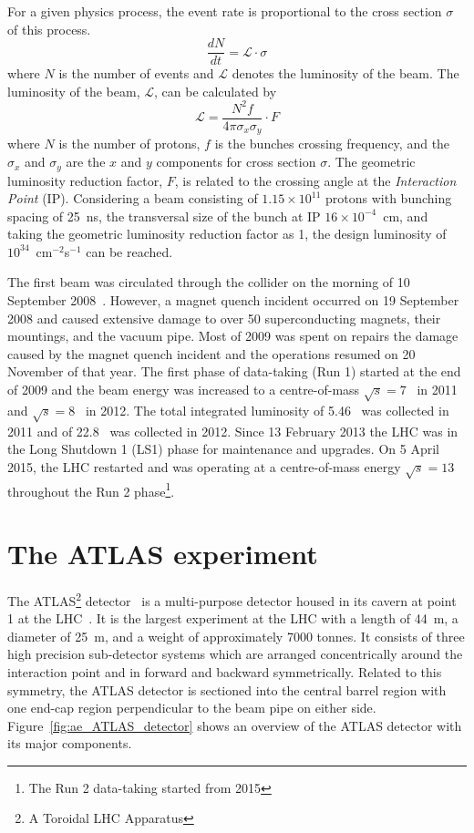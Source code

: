 For a given physics process, the event rate is proportional to the cross section $\sigma$ of this process.
%
\begin{equation}
\frac{dN}{dt} = \mathcal{L}\cdot\sigma
\end{equation}
%
where $N$ is the number of events and $\mathcal{L}$ denotes the luminosity of the beam.
The luminosity of the beam, $\mathcal{L}$, can be calculated by
%
\begin{equation}
\mathcal{L} = \frac{N^{2} f}{4 \pi \sigma_{x} \sigma_{y}} \cdot F
\end{equation}
%
where $N$ is the number of protons, $f$ is the bunches crossing frequency, and the $\sigma_{x}$ and $\sigma_{y}$ are the $x$ and $y$ components for cross section $\sigma$.
The geometric luminosity reduction factor, $F$, is related to the crossing angle at the \textit{Interaction Point} (IP).
Considering a beam consisting of $1.15 \times 10^{11}$ protons with bunching spacing of 25~ns, the transversal size of the bunch at IP $16\times 10^{-4}$~cm, and taking the geometric luminosity reduction factor as 1, the design luminosity of $10^{34}$~cm$^{-2}$s$^{-1}$ can be reached.

The first beam was circulated through the collider on the morning of 10 September 2008~\cite{CERN-COURIER-Sep192008}.
However, a magnet quench incident occurred on 19 September 2008 and caused extensive damage to over 50 superconducting magnets, their mountings, and the vacuum pipe.
Most of 2009 was spent on repairs the damage caused by the magnet quench incident and the operations resumed on 20 November of that year.
The first phase of data-taking (Run 1) started at the end of 2009 and the beam energy was increased to a centre-of-mass $\sqrt{s}=7$~{\TeV} in 2011 and $\sqrt{s} = 8$~{\TeV} in 2012.
The total integrated luminosity of 5.46~{\ifb} was collected in 2011 and of 22.8~{\ifb} was collected in 2012.
Since 13 February 2013 the LHC was in the Long Shutdown 1 (LS1) phase for maintenance and upgrades.
On 5 April 2015, the LHC restarted and was operating at a centre-of-mass energy $\sqrt{s}=13$~{\TeV} throughout the Run 2 phase\footnote{The Run 2 data-taking started from 2015}.


\section{The ATLAS experiment}
\label{sec:ae_ATLAS}
The ATLAS\footnote{A Toroidal LHC Apparatus} detector~\cite{1748-0221-3-08-S08003} is a multi-purpose detector housed in its cavern at point 1 at the LHC~\cite{1748-0221-3-08-S08001}.
It is the largest experiment at the LHC with a length of 44~m, a diameter of 25~m, and a weight of approximately 7000 tonnes.
It consists of three high precision sub-detector systems which are arranged concentrically around the interaction point and in forward and backward symmetrically.
Related to this symmetry, the ATLAS detector is sectioned into the central barrel region with one end-cap region perpendicular to the beam pipe on either side.
Figure~\ref{fig:ae_ATLAS_detector} shows an overview of the ATLAS detector with its major components.

